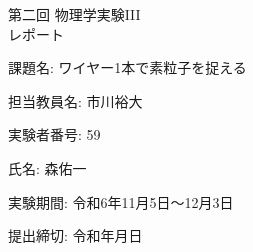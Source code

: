 \begin{titlepage}
  \centering
  \vspace*{4cm}
  \Huge{第二回 物理学実験III\\レポート}
  
  \vspace*{1cm}
  \large{課題名: ワイヤー1本で素粒子を捉える}
  
  \vspace*{0.1cm}
  \large{担当教員名: 市川裕大}

  \vspace*{0.5cm}
  \large{実験者番号: 59}

  \vspace{0.1cm}
  \large{氏名: 森佑一}

  \vspace*{0.1cm}
  \large{実験期間: 令和6年11月5日〜12月3日}


  \vspace*{0.1cm}
  \large{提出締切: 令和年月日}

\end{titlepage}